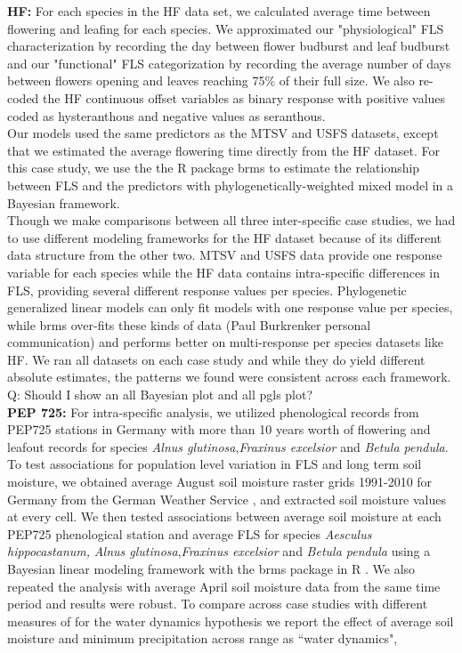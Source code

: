 \documentclass[12pt]{article}\usepackage[]{graphicx}\usepackage[]{color}
\begin{document}
\indent \textbf{HF:} For each species in the HF data set, we calculated average time between flowering and leafing for each species. We approximated our "physiological" FLS characterization by recording the day between flower budburst and leaf budburst and our "functional" FLS categorization by recording the average number of days between flowers opening and leaves reaching 75\% of their full size. We also re-coded the HF continuous offset variables as binary response with positive values coded as hysteranthous and negative values as seranthous.\\ Our models used the same predictors as the MTSV and USFS datasets, except that we estimated the average flowering time directly from the HF dataset. For this case study, we use the the R package brms\citep{} to estimate the relationship between FLS and the predictors with  phylogenetically-weighted mixed model in a Bayesian framework.\\ 
\indent Though we make comparisons between all three inter-specific case studies, we had to use different modeling frameworks for the HF dataset because of its different data structure from the other two. MTSV and USFS data provide one response variable for each species while the HF data contains intra-specific differences in FLS, providing several different response values per species. Phylogenetic generalized linear models can only fit models with one response value per species, while brms over-fits these kinds of data \citep{} (Paul Burkrenker personal communication) and performs better on multi-response per species datasets like HF. We ran all datasets on each case study and while they do yield different absolute estimates, the patterns we found were consistent across each framework. Q: Should I show an all Bayesian plot and all pgls plot? \\
\indent \textbf{PEP 725:} For intra-specific analysis, we utilized phenological records from PEP725 stations in Germany with more than 10 years worth of flowering and leafout records \citep{PEP725} for species \textit{Alnus glutinosa},\textit{Fraxinus excelsior} and \textit {Betula pendula}. To test associations for population level variation in FLS and long term soil moisture, we obtained average August soil moisture raster grids 1991-2010 for Germany from the German Weather Service \citep{DWD}, and extracted soil moisture values at every cell. We then tested associations between average soil moisture at each PEP725 phenological station and average FLS for species \textit{Aesculus hippocastanum,} \textit{Alnus glutinosa},\textit{Fraxinus excelsior} and \textit {Betula pendula} using a Bayesian linear modeling framework with the brms package in R \citep{Burkner2018}. We also repeated the analysis with average April soil moisture data from the same time period and results were robust. To compare across case studies with different measures of for the water dynamics hypothesis  we report the effect of average soil moisture and minimum precipitation across range as ``water dynamics",\\
\end{document}
